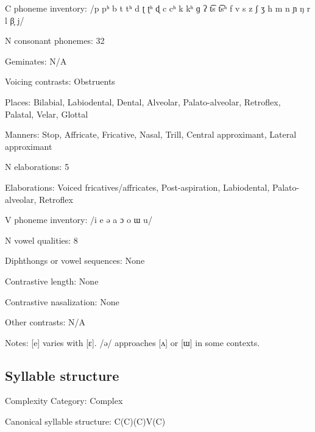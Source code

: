 {\begin{appendixdesc}
\item[C phoneme inventory:] /p pʰ b t tʰ d ʈ ʈʰ ɖ c cʰ k kʰ ɡ ʔ t͡s t͡sʰ f v s z ʃ ʒ h m n ɲ ŋ r l β̞ j/

\item[N consonant phonemes:] 32

\item[Geminates:] N/A

\item[Voicing contrasts:] Obstruents

\item[Places:] Bilabial, Labiodental, Dental, Alveolar, Palato-alveolar, Retroflex, Palatal, Velar, Glottal

\item[Manners:] Stop, Affricate, Fricative, Nasal, Trill, Central approximant, Lateral approximant

\item[N elaborations:] 5

\item[Elaborations:] Voiced fricatives/affricates, Post-aspiration, Labiodental, Palato-alveolar, Retroflex

\item[V phoneme inventory:] /i e ə a ɔ o ɯ u/

\item[N vowel qualities:] 8

\item[Diphthongs or vowel sequences:] None

\item[Contrastive length:] None

\item[Contrastive nasalization:] None

\item[Other contrasts:] N/A

\item[Notes:] [e] varies with [ɛ]. /ə/ approaches [ʌ] or [ɯ] in some contexts.
\end{appendixdesc}
\subsection*{Syllable structure}
\begin{appendixdesc}

\item[Complexity Category:] Complex

\item[Canonical syllable structure:] C(C)(C)V(C) \citep[30--32]{Plaisier2007}


\end{appendixdesc}}
